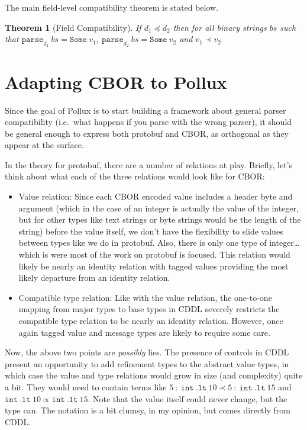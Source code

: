 \documentclass[11pt]{article}
\theoremstyle{definition}
\theoremstyle{plain}
\newtheorem{theorem}{Theorem}
\begin{document}
The main field-level compatibility theorem is stated below.
\\
\begin{theorem}[Field Compatibility]
  If $d_1 \preceq d_2$ then for all binary strings $bs$ such that
  $\mathtt{parse}_{d_1}\ bs = \mathtt{Some}\ v_1$, $\mathtt{parse}_{d_2}\ bs =
  \mathtt{Some}\ v_2$ and $v_1 \prec v_2$
\end{theorem}

\section{Adapting CBOR to Pollux}

Since the goal of Pollux is to start building a framework about general parser
compatibility (i.e.\ what happens if you parse with the wrong parser), it should
be general enough to express both protobuf and CBOR, as orthogonal as they
appear at the surface.

In the theory for protobuf, there are a number of relations at play. Briefly,
let's think about what each of the three relations would look like for CBOR:

\begin{itemize}
\item Value relation: Since each CBOR encoded value includes a header byte and
  argument (which in the case of an integer is actually the value of the
  integer, but for other types like text strings or byte strings would be the
  length of the string) before the value itself, we don't have the flexibility
  to slide values between types like we do in protobuf. Also, there is only one
  type of integer\ldots which is were most of the work on protobuf is focused. This
  relation would likely be nearly an identity relation with tagged values
  providing the most likely departure from an identity relation.
\item Compatible type relation: Like with the value relation, the one-to-one
  mapping from major types to base types in CDDL severely restricts the
  compatible type relation to be nearly an identity relation. However, once
  again tagged value and message types are likely to require some care.
\end{itemize}

Now, the above two points are \emph{possibly} lies. The presence of controls in
CDDL present an opportunity to add refinement types to the abstract value types,
in which case the value and type relations would grow in size (and complexity)
quite a bit. They would need to contain terms like
$5\ :\ \mathtt{int}\ .\mathtt{lt}\ 10 \prec 5\ :\ \mathtt{int}\ .\mathtt{lt}\ 15$
and $\mathtt{int}\ \mathtt{.lt}\ 10 \propto \mathtt{int}\ \mathtt{.lt}\ 15$. Note that
the value itself could never change, but the type can. The notation is a bit
clumsy, in my opinion, but comes directly from CDDL.
\end{document}
